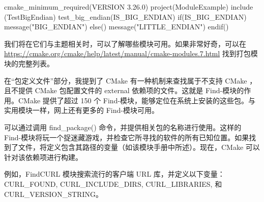 \begin{cmake}
cmake_minimum_required(VERSION 3.26.0)
project(ModuleExample)
include (TestBigEndian)
test_big_endian(IS_BIG_ENDIAN)
if(IS_BIG_ENDIAN)
    message("BIG_ENDIAN")
else()
    message("LITTLE_ENDIAN")
endif()
\end{cmake}

我们将在它们与主题相关时，可以了解哪些模块可用。如果非常好奇，可以在 \url{https://cmake.org/cmake/help/latest/manual/cmake-modules.7.html} 找到打包模块的完整列表。


在“包定义文件”部分，我提到了 CMake 有一种机制来查找属于不支持 CMake ，且不提供 CMake 包配置文件的 external 依赖项的文件。这就是 Find-模块的作用。CMake 提供了超过 150 个 Find-模块，能够定位在系统上安装的这些包。与实用模块一样，网上还有更多的 Find-模块可用。

可以通过调用 find\_package() 命令，并提供相关包的名称进行使用。这样的 Find-模块将玩一个捉迷藏游戏，并检查它所寻找的软件的所有已知位置。如果找到了文件，将定义包含其路径的变量（如该模块手册中所述）。现在，CMake 可以针对该依赖项进行构建。

例如，FindCURL 模块搜索流行的客户端 URL 库，并定义以下变量：CURL\_FOUND, CURL\_INCLUDE\_DIRS, CURL\_LIBRARIES, 和 CURL\_VERSION\_STRING。







































